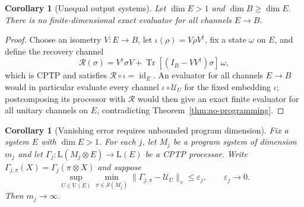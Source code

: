 \documentclass[11pt,a4paper]{article}
\newtheorem{corollary}[theorem]{Corollary}
\newcommand{\Lin}{\mathrm{L}}
\newcommand{\Sstate}{\mathcal{S}}
\newcommand{\Tr}{\operatorname{Tr}}
\newcommand{\id}{\operatorname{id}}
\begin{document}
\begin{corollary}[Unequal output systems]
\label{cor:unequal}
Let $\dim E>1$ and $\dim B\ge\dim E$. There is no finite-dimensional exact evaluator for all channels $E\to B$.
\end{corollary}

\begin{proof}
Choose an isometry $V:E\to B$, let $\iota(\rho)=V\rho V^\dagger$, fix a state $\omega$ on $E$, and define the recovery channel
\[
\mathcal R(\sigma)=V^\dagger\sigma V+\Tr[(I_B-VV^\dagger)\sigma]\,\omega,
\]
which is CPTP and satisfies $\mathcal R\circ\iota=\id_E$. An evaluator for all channels $E\to B$ would in particular evaluate every channel $\iota\circ\mathcal U_U$ for the fixed embedding $\iota$; postcomposing its processor with $\mathcal R$ would then give an exact finite evaluator for all unitary channels on $E$, contradicting Theorem~\ref{thm:no-programming}.
\end{proof}

\begin{corollary}[Vanishing error requires unbounded program dimension]
\label{cor:divergence}
Fix a system $E$ with $\dim E>1$. For each $j$, let $M_j$ be a program system of dimension $m_j$ and let $\Gamma_j:\Lin(M_j\otimes E)\to\Lin(E)$ be a CPTP processor. Write $\Gamma_{j,\pi}(X)=\Gamma_j(\pi\otimes X)$ and suppose
\[
\sup_{U\in\mathrm U(E)}\min_{\pi\in\Sstate(M_j)}
\|\Gamma_{j,\pi}-\mathcal U_U\|_\diamond
\le\varepsilon_j,\qquad\varepsilon_j\longrightarrow0.
\]
Then $m_j\to\infty$.
\end{corollary}
\end{document}
